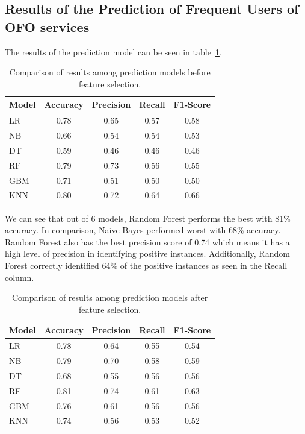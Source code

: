 \documentclass[a4paper,fleqn]{cas-sc}
\begin{document}
\subsection{Results of the Prediction of Frequent Users of OFO services}
The results of the prediction model can be seen in table~\ref{tab:pred_before}.

\begin{table}[htb]
    \caption{Comparison of results among prediction models before feature selection.}
    \label{tab:pred_before}
    \begin{tabular*}{\linewidth}{@{\extracolsep{\fill}}lcccc@{}}
        \toprule
        Model & Accuracy & Precision & Recall & F1-Score \\
        \midrule
        LR  & 0.78 & 0.65 & 0.57 & 0.58 \\
        NB  & 0.66 & 0.54 & 0.54 & 0.53 \\
        DT  & 0.59 & 0.46 & 0.46 & 0.46 \\
        RF  & 0.79 & 0.73 & 0.56 & 0.55 \\
        GBM & 0.71 & 0.51 & 0.50 & 0.50 \\
        KNN & 0.80 & 0.72 & 0.64 & 0.66 \\
        \bottomrule
    \end{tabular*}
\end{table}


We can see that out of 6 models, Random Forest performs the best with 81\% accuracy. In comparison, Naive Bayes performed worst with 68\% accuracy. Random Forest also has the best precision score of 0.74 which means it has a high level of precision in identifying positive instances. Additionally, Random Forest correctly identified 64\% of the positive instances as seen in the Recall column.

\begin{table}[htb]
    \caption{Comparison of results among prediction models after feature selection.}
    \label{tab:pred_after}
    \begin{tabular*}{\linewidth}{@{\extracolsep{\fill}}lcccc@{}}
        \toprule
        Model & Accuracy & Precision & Recall & F1-Score \\
        \midrule
        LR  & 0.78 & 0.64 & 0.55 & 0.54 \\
        NB  & 0.79 & 0.70 & 0.58 & 0.59 \\
        DT  & 0.68 & 0.55 & 0.56 & 0.56 \\
        RF  & 0.81 & 0.74 & 0.61 & 0.63 \\
        GBM & 0.76 & 0.61 & 0.56 & 0.56 \\
        KNN & 0.74 & 0.56 & 0.53 & 0.52 \\
        \bottomrule
    \end{tabular*}
\end{table}
\end{document}
